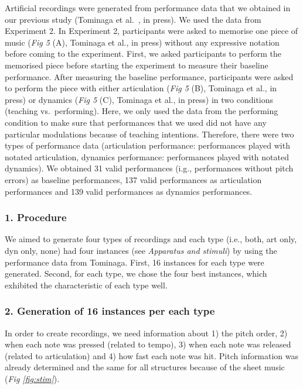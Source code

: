 \documentclass[
  man,floatsintext]{apa6}
\begin{document}
Artificial recordings were generated from performance data that we obtained in our previous study (Tominaga et al.~, in press). We used the data from Experiment 2. In Experiment 2, participants were asked to memorise one piece of music (\emph{Fig 5} (A), Tominaga et al., in press) without any expressive notation before coming to the experiment. First, we asked participants to perform the memorised piece before starting the experiment to measure their baseline performance. After measuring the baseline performance, participants were asked to perform the piece with either articulation (\emph{Fig 5} (B), Tominaga et al., in press) or dynamics (\emph{Fig 5} (C), Tominaga et al., in press) in two conditions (teaching vs.~performing). Here, we only used the data from the performing condition to make sure that performances that we used did not have any particular modulations because of teaching intentions. Therefore, there were two types of performance data (articulation performance: performances played with notated articulation, dynamics performance: performances played with notated dynamics). We obtained 31 valid performances (i.g., performances without pitch errors) as baseline performances, 137 valid performances as articulation performances and 139 valid performances as dynamics performances.

\hypertarget{procedure-1}{%
\subsubsection{1. Procedure}\label{procedure-1}}

We aimed to generate four types of recordings and each type (i.e., both, art only, dyn only, none) had four instances (see \emph{Apparatus and stimuli}) by using the performance data from Tominaga. First, 16 instances for each type were generated. Second, for each type, we chose the four best instances, which exhibited the characteristic of each type well.

\hypertarget{generation-of-16-instances-per-each-type}{%
\subsubsection{2. Generation of 16 instances per each type}\label{generation-of-16-instances-per-each-type}}

In order to create recordings, we need information about 1) the pitch order, 2) when each note was pressed (related to tempo), 3) when each note was released (related to articulation) and 4) how fast each note was hit. Pitch information was already determined and the same for all structures because of the sheet music (\emph{Fig \ref{fig:stim}}).
\end{document}
